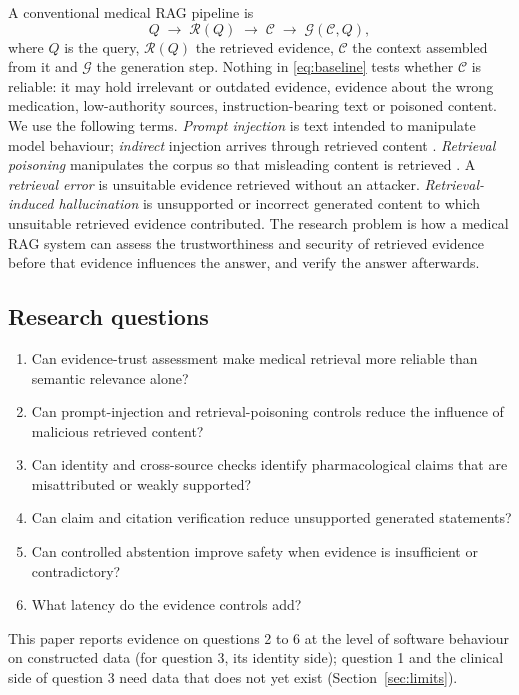 \documentclass[conference]{IEEEtran}
\begin{document}
A conventional medical RAG pipeline is
\begin{equation}
Q \;\rightarrow\; \mathcal{R}(Q) \;\rightarrow\; \mathcal{C} \;\rightarrow\; \mathcal{G}(\mathcal{C}, Q),
\label{eq:baseline}
\end{equation}
where $Q$ is the query, $\mathcal{R}(Q)$ the retrieved evidence, $\mathcal{C}$ the context assembled from it and
$\mathcal{G}$ the generation step. Nothing in \eqref{eq:baseline} tests whether $\mathcal{C}$ is reliable: it may hold
irrelevant or outdated evidence, evidence about the wrong medication, low-authority sources, instruction-bearing text or
poisoned content. We use the following terms. \emph{Prompt injection} is text intended to manipulate model behaviour;
\emph{indirect} injection arrives through retrieved content \cite{greshake2023indirect}. \emph{Retrieval poisoning}
manipulates the corpus so that misleading content is retrieved \cite{zou2025poisonedrag}. A \emph{retrieval error} is
unsuitable evidence retrieved without an attacker. \emph{Retrieval-induced hallucination} is unsupported or incorrect
generated content to which unsuitable retrieved evidence contributed. The research problem is how a medical RAG system
can assess the trustworthiness and security of retrieved evidence before that evidence influences the answer, and verify
the answer afterwards.

\subsection{Research questions}

\begin{enumerate}
\item Can evidence-trust assessment make medical retrieval more reliable than semantic relevance alone?
\item Can prompt-injection and retrieval-poisoning controls reduce the influence of malicious retrieved content?
\item Can identity and cross-source checks identify pharmacological claims that are misattributed or weakly supported?
\item Can claim and citation verification reduce unsupported generated statements?
\item Can controlled abstention improve safety when evidence is insufficient or contradictory?
\item What latency do the evidence controls add?
\end{enumerate}
This paper reports evidence on questions 2 to 6 at the level of software behaviour on constructed data (for
question 3, its identity side); question 1 and the clinical side of question 3 need data that does not yet exist
(Section~\ref{sec:limits}).
\end{document}

